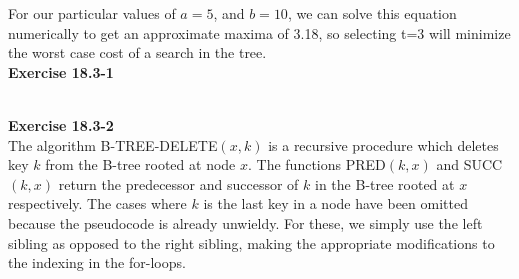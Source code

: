 \documentclass{article}
\begin{document}
For our particular values of $a=5$, and $b=10$, we can solve this equation numerically to get an approximate maxima of 3.18, so selecting t=3 will minimize the worst case cost of a search in the tree.\\



\noindent\textbf{Exercise 18.3-1}\\



\\

\noindent\textbf{Exercise 18.3-2}\\

The algorithm B-TREE-DELETE$(x,k)$ is a recursive procedure which deletes key $k$ from the B-tree rooted at node $x$. The functions PRED$(k,x)$ and SUCC$(k,x)$ return the predecessor and successor of $k$ in the B-tree rooted at $x$ respectively.  The cases where $k$ is the last key in a node have been omitted because the pseudocode is already unwieldy.  For these, we simply use the left sibling as opposed to the right sibling, making the appropriate modifications to the indexing in the for-loops. \\
\end{document}
